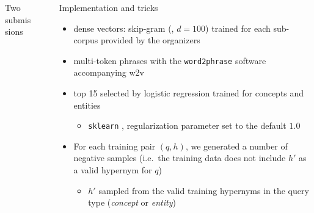\documentclass{beamer}
\newlength{\sepwid}
\newlength{\onecolwid}
\newcommand{\bull}[1]{
  \begin{itemize}
    \item #1
  \end{itemize}
}
\begin{document}
\begin{frame}[t]
\begin{columns}[t]
\begin{column}{\onecolwid}
\begin{block}{Two submissions}

  \end{block}


\end{column}

\begin{column}{\sepwid} %
\end{column}

\begin{column}{\onecolwid}



  \begin{block}{Implementation and tricks}
    \begin{itemize}
      \item \alert{dense vectors}: skip-gram (\cite{Mikolov:2013f}, $d=100$) trained
        for each sub-corpus provided by the organizers 
      \item multi-token \alert{phrases} with the \texttt{word2phrase}
        software accompanying w2v
      \item top 15 selected by \alert{logistic regression} trained for concepts
        and entities 
        \bull{\texttt{sklearn}
        \citep{Pedregosa:2011},%
        regularization parameter set to the default $1.0$}

      \item For each training pair $(q,h)$, we generated a number of \alert{negative
        samples} (i.e.~the training data does not include $h'$ as a valid hypernym for
        $q$)
        \bull{$h'$ sampled from the valid training hypernyms in  the query type
        (\textit{concept} or \textit{entity})}


\end{itemize}
\end{block}
\end{column}
\end{columns}
\end{frame}
\end{document}
